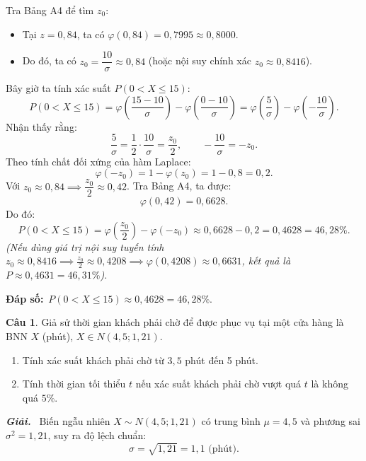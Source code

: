 \documentclass[12pt,a4paper]{article}
\theoremstyle{definition}
\newtheorem{cau}{Câu}
\newcommand{\giai}{\noindent\textbf{\textit{Giải.}}\ }
\newcommand{\dapso}[1]{\noindent\textbf{Đáp số:}\ #1}
\begin{document}
Tra Bảng A4 để tìm $z_0$:
\begin{itemize}
    \item Tại $z = 0{,}84$, ta có $\varphi(0{,}84) = 0{,}7995 \approx 0{,}8000$.
    \item Do đó, ta có $z_0 = \dfrac{10}{\sigma} \approx 0{,}84$ (hoặc nội suy chính xác $z_0 \approx 0{,}8416$).
\end{itemize}

Bây giờ ta tính xác suất $P(0 < X \le 15)$:
\[
P(0 < X \le 15) = \varphi\left(\frac{15 - 10}{\sigma}\right) - \varphi\left(\frac{0 - 10}{\sigma}\right) = \varphi\left(\frac{5}{\sigma}\right) - \varphi\left(-\frac{10}{\sigma}\right).
\]
Nhận thấy rằng:
\[
\frac{5}{\sigma} = \frac{1}{2} \cdot \frac{10}{\sigma} = \frac{z_0}{2}, \qquad -\frac{10}{\sigma} = -z_0.
\]
Theo tính chất đối xứng của hàm Laplace:
\[
\varphi(-z_0) = 1 - \varphi(z_0) = 1 - 0{,}8 = 0{,}2.
\]
Với $z_0 \approx 0{,}84 \implies \dfrac{z_0}{2} \approx 0{,}42$. Tra Bảng A4, ta được:
\[
\varphi(0{,}42) = 0{,}6628.
\]
Do đó:
\[
P(0 < X \le 15) = \varphi\left(\frac{z_0}{2}\right) - \varphi(-z_0) \approx 0{,}6628 - 0{,}2 = 0{,}4628 = 46{,}28\%.
\]
\textit{(Nếu dùng giá trị nội suy tuyến tính $z_0 \approx 0{,}8416 \implies \frac{z_0}{2} \approx 0{,}4208 \implies \varphi(0{,}4208) \approx 0{,}6631$, kết quả là $P \approx 0{,}4631 = 46{,}31\%$).}

\dapso{$P(0 < X \le 15) \approx 0{,}4628 = 46{,}28\%$.}

\vspace{1.5em}
\begin{cau}
Giả sử thời gian khách phải chờ để được phục vụ tại một cửa hàng là BNN $X$ (phút), $X \in N(4{,}5; 1{,}21)$.
\begin{enumerate}[label=\arabic*)]
    \item Tính xác suất khách phải chờ từ $3{,}5$ phút đến 5 phút.
    \item Tính thời gian tối thiểu $t$ nếu xác suất khách phải chờ vượt quá $t$ là không quá $5\%$.
\end{enumerate}
\end{cau}

\giai
Biến ngẫu nhiên $X \sim N(4{,}5; 1{,}21)$ có trung bình $\mu = 4{,}5$ và phương sai $\sigma^2 = 1{,}21$, suy ra độ lệch chuẩn:
\[
\sigma = \sqrt{1{,}21} = 1{,}1\text{ (phút)}.
\]
\end{document}
